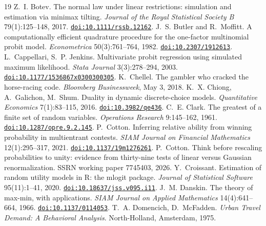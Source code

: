 \documentclass[11pt]{article}
\begin{document}
\begin{thebibliography}{19}
 Z.~I. Botev.
The normal law under linear restrictions: simulation and estimation via minimax
tilting. \emph{Journal of the Royal Statistical Society B} 79(1):125--148, 2017.
\href{https://doi.org/10.1111/rssb.12162}{\nolinkurl{doi:10.1111/rssb.12162}}.
 J.~S. Butler and R.~Moffitt.
A computationally efficient quadrature procedure for the one-factor
multinomial probit model. \emph{Econometrica} 50(3):761--764, 1982.
\href{https://doi.org/10.2307/1912613}{\nolinkurl{doi:10.2307/1912613}}.
 L.~Cappellari,
S.~P. Jenkins. Multivariate probit regression using simulated maximum
likelihood. \emph{Stata Journal} 3(3):278--294, 2003.
\href{https://doi.org/10.1177/1536867x0300300305}{\nolinkurl{doi:10.1177/1536867x0300300305}}.
 K.~Chellel. The gambler who
cracked the horse-racing code. \emph{Bloomberg Businessweek}, May 3,
2018.
 K.~X. Chiong, A.~Galichon, M.~Shum.
Duality in dynamic discrete-choice models.
\emph{Quantitative Economics} 7(1):83--115, 2016.
\href{https://doi.org/10.3982/qe436}{\nolinkurl{doi:10.3982/qe436}}.
 C.~E. Clark.
The greatest of a finite set of random variables.
\emph{Operations Research} 9:145--162, 1961.
\href{https://doi.org/10.1287/opre.9.2.145}{\nolinkurl{doi:10.1287/opre.9.2.145}}.
 P.~Cotton.
Inferring relative ability from winning probability in multientrant contests.
\emph{SIAM Journal on Financial Mathematics} 12(1):295--317, 2021.
\href{https://doi.org/10.1137/19m1276261}{\nolinkurl{doi:10.1137/19m1276261}}.
 P.~Cotton. Think before rescaling
probabilities to unity: evidence from thirty-nine tests of linear versus
Gaussian renormalization. SSRN working paper 7745403, 2026.
 Y.~Croissant.
Estimation of random utility models in R: the mlogit package.
\emph{Journal of Statistical Software} 95(11):1--41, 2020.
\href{https://doi.org/10.18637/jss.v095.i11}{\nolinkurl{doi:10.18637/jss.v095.i11}}.
 J.~M. Danskin. The theory of
max-min, with applications. \emph{SIAM Journal on Applied Mathematics}
14(4):641--664, 1966.
\href{https://doi.org/10.1137/0114053}{\nolinkurl{doi:10.1137/0114053}}.
 T.~A. Domencich,
D.~McFadden. \emph{Urban Travel Demand: A Behavioral Analysis}.
North-Holland, Amsterdam, 1975.

\end{thebibliography}
\end{document}
